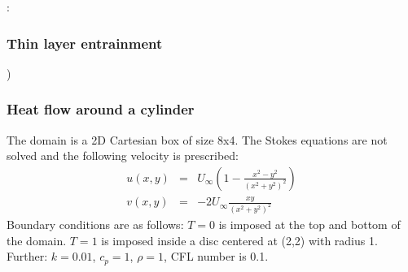 \Literature: \cite{taie87}

\subsubsection{Thin layer entrainment} \label{sec:tlentr})




\subsubsection{Heat flow around a cylinder} \label{sec:hfcyl}

The domain is a 2D Cartesian box of size 8x4.
The Stokes equations are not solved and the following velocity is prescribed:
\begin{eqnarray}
u(x,y)&=& U_\infty \left(  1-\frac{x^2-y^2}{(x^2+y^2)^2}  \right) \\
v(x,y)&=& -2U_\infty \frac{xy}{(x^2+y^2)^2}
\end{eqnarray}
Boundary conditions are as follows:
$T=0$ is imposed at the top and bottom of the domain. 
$T=1$ is imposed inside a disc centered at (2,2) with radius 1.  
Further: $k=0.01$, $c_p=1$, $\rho=1$, CFL number is 0.1.


